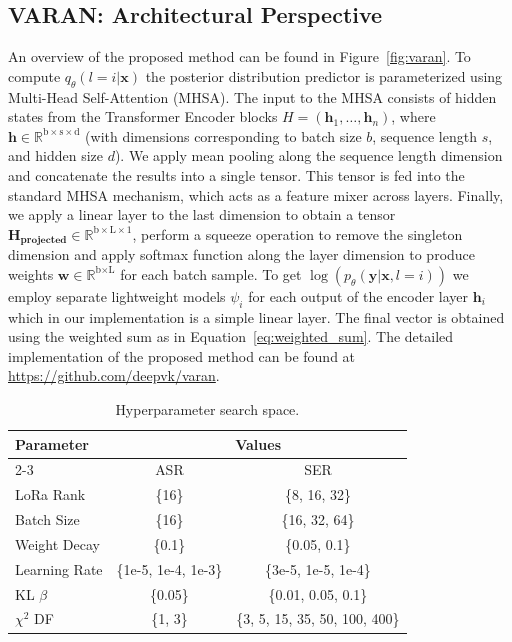 \subsection{VARAN: Architectural Perspective}

An overview of the proposed method can be found in Figure~\ref{fig:varan}. To compute $q_\theta(l=i|\boldsymbol{x})$ the posterior distribution predictor is parameterized using Multi-Head Self-Attention (MHSA). The input to the MHSA consists of hidden states from the Transformer Encoder blocks $H = (\boldsymbol{h}_1, \dots, \boldsymbol{h}_n)$, where $\mathbf{h} \in \mathbb{R}^{\text{b} \times \text{s} \times \text{d}}$ (with dimensions corresponding to batch size $b$, sequence length $s$, and hidden size $d$). We apply mean pooling along the sequence length dimension and concatenate the results into a single tensor. This tensor is fed into the standard MHSA mechanism, which acts as a feature mixer across layers. 
Finally, we apply a linear layer to the last dimension to obtain a tensor $\mathbf{H_\text{projected}} \in \mathbb{R}^{\text{b} \times \text{L} \times 1}$, perform a squeeze operation to remove the singleton dimension and apply softmax function along the layer dimension to produce weights $\mathbf{w} \in \mathbb{R}^{\text{b} \times \text{L}}$ for each batch sample. To get $\log(p_\theta(\boldsymbol{y}|\boldsymbol{x}, l=i))$ we employ separate lightweight models $\psi_i$ for each output of the encoder layer $\boldsymbol{h}_i$ which in our implementation is a simple linear layer. The final vector is obtained using the weighted sum as in Equation~\ref{eq:weighted_sum}. The detailed implementation of the proposed method can be found at \url{https://github.com/deepvk/varan}.



\begin{table}[hb]
    \centering
    \begin{tabular}{@{} l| c c @{}}
        \toprule
        \multirow{2}{.0\linewidth}{Parameter} & \multicolumn{2}{c}{Values} \\ 
        \cmidrule(lr){2-3}
         & ASR & SER \\
        \midrule
        LoRa Rank & \{16\} & \{8, 16, 32\} \\
        Batch Size & \{16\} & \{16, 32, 64\} \\
        Weight Decay & \{0.1\} & \{0.05, 0.1\} \\
        Learning Rate & \{1e-5, 1e-4, 1e-3\} & \{3e-5, 1e-5, 1e-4\} \\
        KL $\beta$ & \{0.05\} & \{0.01, 0.05, 0.1\} \\
        $\chi^2$ DF & \{1, 3\} & \{3, 5, 15, 35, 50, 100, 400\} \\
        \bottomrule
    \end{tabular}
    \caption{Hyperparameter search space.}
    \label{tab:hp}
\end{table}



